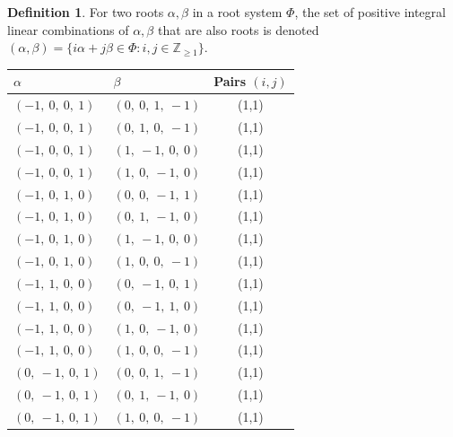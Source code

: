 \documentclass[11pt]{article}
\newcommand{\noi}{\noindent}
\theoremstyle{definition}
\newtheorem{definition}{Definition}[section]
\begin{document}
\begin{definition}
For two roots $\alpha, \beta$ in a root system $\Phi$, the set of positive integral linear combinations of $\alpha, \beta$ that are also roots is denoted
\(
	(\alpha, \beta) = \{ i \alpha + j \beta \in \Phi : i, j \in \mathbb{Z}_{\ge 1} \}
\).
\end{definition}
\noi \noindent \begin{longtable}{|l|l|c|}
    \hline
    $\alpha$ & $\beta$ & Pairs $(i,j)$ \\
    \hline
    \endhead
    $\left( -1, \  0, \  0, \  1\right)$ & $\left( 0, \  0, \  1, \  -1\right)$ & (1,1) \\
    \hline
    $\left( -1, \  0, \  0, \  1\right)$ & $\left( 0, \  1, \  0, \  -1\right)$ & (1,1) \\
    \hline
    $\left( -1, \  0, \  0, \  1\right)$ & $\left( 1, \  -1, \  0, \  0\right)$ & (1,1) \\
    \hline
    $\left( -1, \  0, \  0, \  1\right)$ & $\left( 1, \  0, \  -1, \  0\right)$ & (1,1) \\
    \hline
    $\left( -1, \  0, \  1, \  0\right)$ & $\left( 0, \  0, \  -1, \  1\right)$ & (1,1) \\
    \hline
    $\left( -1, \  0, \  1, \  0\right)$ & $\left( 0, \  1, \  -1, \  0\right)$ & (1,1) \\
    \hline
    $\left( -1, \  0, \  1, \  0\right)$ & $\left( 1, \  -1, \  0, \  0\right)$ & (1,1) \\
    \hline
    $\left( -1, \  0, \  1, \  0\right)$ & $\left( 1, \  0, \  0, \  -1\right)$ & (1,1) \\
    \hline
    $\left( -1, \  1, \  0, \  0\right)$ & $\left( 0, \  -1, \  0, \  1\right)$ & (1,1) \\
    \hline
    $\left( -1, \  1, \  0, \  0\right)$ & $\left( 0, \  -1, \  1, \  0\right)$ & (1,1) \\
    \hline
    $\left( -1, \  1, \  0, \  0\right)$ & $\left( 1, \  0, \  -1, \  0\right)$ & (1,1) \\
    \hline
    $\left( -1, \  1, \  0, \  0\right)$ & $\left( 1, \  0, \  0, \  -1\right)$ & (1,1) \\
    \hline
    $\left( 0, \  -1, \  0, \  1\right)$ & $\left( 0, \  0, \  1, \  -1\right)$ & (1,1) \\
    \hline
    $\left( 0, \  -1, \  0, \  1\right)$ & $\left( 0, \  1, \  -1, \  0\right)$ & (1,1) \\
    \hline
    $\left( 0, \  -1, \  0, \  1\right)$ & $\left( 1, \  0, \  0, \  -1\right)$ & (1,1) \\

\end{longtable}
\end{document}

